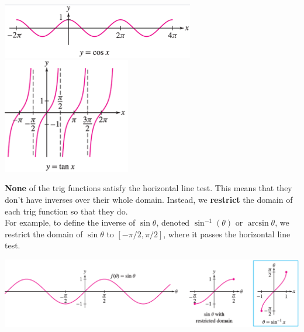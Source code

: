 \documentclass[11pt,reqno,final]{amsart}
\numberwithin{equation}{section}
\numberwithin{figure}{section}
\theoremstyle{definition} %
\begin{document}
\begin{minipage}{.6\textwidth}
        \begin{center}
                \includegraphics[width=3.3in]{cos.png}\\
                \includegraphics[width=2.2in]{tan.png}
        \end{center}
\end{minipage}
\begin{minipage}{.4\textwidth}
        \textbf{None} of the trig functions satisfy the horizontal line test.
        This means that they don't have inverses over their whole domain.
        Instead, we \textbf{restrict} the domain of each trig function so that they do.\\
        
        For example, to define the inverse of $\sin \theta$, denoted $\sin^{-1}(\theta)$ or $\arcsin \theta$,
        we restrict the domain of $\sin \theta$ to $[-\pi/2,\pi/2]$,
        where it passes the horizontal line test.
\end{minipage}

\begin{center}
        \includegraphics[width=\textwidth]{restrict_sin.png}
\end{center}
\end{document}
